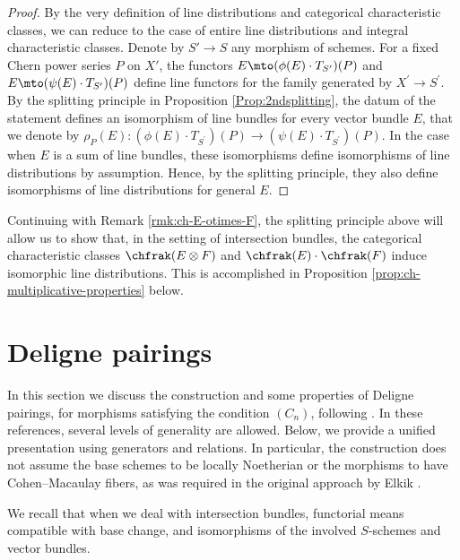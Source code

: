 \begin{proof}
By the very definition of line distributions and categorical characteristic classes, we can reduce to the case of entire line distributions and integral characteristic classes. Denote by $S'\to S$ any morphism of schemes. For a fixed Chern power series $P$ on $X'$, the functors $E \mto (\phi(E) \cdot T_{S^{\prime}})(P)$ and $E \mto (\psi(E) \cdot T_{S'})(P)$ define line functors for the family generated by $X^{\prime}\to S^{\prime}$. By the splitting principle in Proposition \ref{Prop:2ndsplitting}, the datum of the statement defines an isomorphism of line bundles for every vector bundle $E$, that we denote by $\rho_P(E): (\phi(E) \cdot T_{S^{\prime}})(P) \to (\psi(E) \cdot T_{S^{\prime}})(P)$. In the case when $E$ is a sum of line bundles, these isomorphisms define isomorphisms of line distributions by assumption. Hence, by the splitting principle, they also define isomorphisms of line distributions for general $E$.
\end{proof}

\begin{remark}\label{rmk:ch-E-otimes-F-2}
Continuing with Remark \ref{rmk:ch-E-otimes-F}, the splitting principle above will allow us to show that, in the setting of intersection bundles, the categorical characteristic classes $\chfrak(E\otimes F)$ and $\chfrak(E)\cdot\chfrak(F)$ induce isomorphic line distributions. This is accomplished in Proposition \ref{prop:ch-multiplicative-properties} below.
\end{remark}

\section{Deligne pairings}\label{section:intersection-bundles}
In this section we discuss the construction and some properties of Deligne pairings, for morphisms satisfying the condition $(C_n)$, following \cite{Boucksom-Eriksson, Deligne-determinant, Ducrot, Elkikfib, Eriksson-Freixas-Wentworth, Munoz}. In these references, several levels of generality are allowed. Below, we provide a unified presentation using generators and relations. In particular, the construction does not assume the base schemes to be locally Noetherian or the morphisms to have Cohen--Macaulay fibers, as was required in the original approach by Elkik \cite{Elkikfib}.

We recall that when we deal with intersection bundles, functorial means compatible with base change, and isomorphisms of the involved $S$-schemes and vector bundles.


